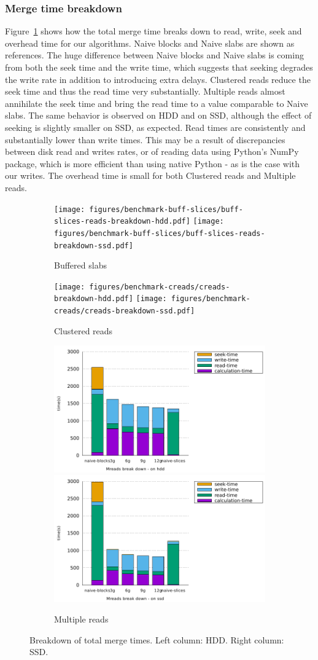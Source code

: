 \documentclass[10pt, conference, compsocconf]{IEEEtran}
\begin{document}
\subsubsection{Merge time breakdown}
Figure~\ref{fig:breakdowns-ssd} shows how the total merge time breaks
down to read, write, seek and overhead time for our algorithms. Naive
blocks and Naive slabs are shown as references. The huge difference
between Naive blocks and Naive slabs is coming from both the seek
time and the write time, which suggests that seeking degrades the
write rate in addition to introducing extra delays.
Clustered reads reduce the seek time and thus the read time very
substantially. Multiple reads almost annihilate the seek time and bring
the read time to a value comparable to Naive slabs.  The same
behavior is observed on HDD and on SSD, although the effect of seeking
is slightly smaller on SSD, as expected. Read times are consistently
and substantially lower than write times. This may be a result of
discrepancies between disk read and writes rates, or of reading data using Python's NumPy
package, which is more efficient than using native Python - as is the
case with our writes. The overhead time is small for both Clustered
reads and Multiple reads.
\begin{figure}
  \begin{subfigure}[b]{\columnwidth}
    \texttt{[image: figures/benchmark-buff-slices/buff-slices-reads-breakdown-hdd.pdf]}
    \texttt{[image: figures/benchmark-buff-slices/buff-slices-reads-breakdown-ssd.pdf]}
    \caption{Buffered slabs}
  \end{subfigure}
  \begin{subfigure}[b]{\columnwidth}
    \texttt{[image: figures/benchmark-creads/creads-breakdown-hdd.pdf]}
    \texttt{[image: figures/benchmark-creads/creads-breakdown-ssd.pdf]}
    \caption{Clustered reads}
  \end{subfigure}
  \begin{subfigure}[b]{\columnwidth}
    \includegraphics[width=0.45\columnwidth]{figures/benchmark-mreads/mreads-breakdown-hdd.pdf}
    \includegraphics[width=0.45\columnwidth]{figures/benchmark-mreads/mreads-breakdown-ssd.pdf}
    \caption{Multiple reads}
  \end{subfigure}
  \caption{Breakdown of total merge times. Left column: HDD. Right column: SSD.}
  \label{fig:breakdowns-ssd}
\end{figure}
\end{document}

